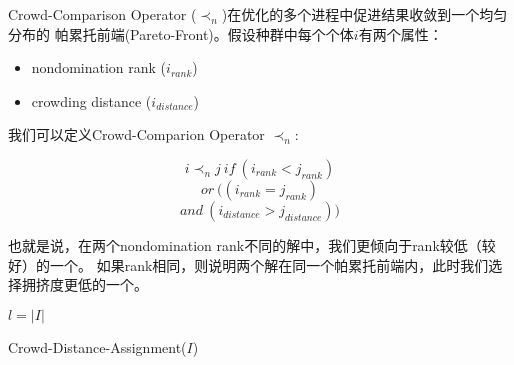 Crowd-Comparison Operator ($\prec_{n}$)在优化的多个进程中促进结果收敛到一个均匀分布的
帕累托前端(Pareto-Front)。假设种群中每个个体$i$有两个属性：
\begin{itemize}
    \item nondomination rank ($i_{rank}$)
    \item crowding distance ($i_{distance}$)
\end{itemize}
我们可以定义Crowd-Comparion Operator $\prec_{n}$:

$$ i \prec_{n} j \ if\  (i_{rank} < j_{rank})$$
$$ or\  ( (i_{rank} = j_{rank}) $$
$$ and\  (i_{distance} > j_{distance}) )$$

也就是说，在两个nondomination rank不同的解中，我们更倾向于rank较低（较好）的一个。
如果rank相同，则说明两个解在同一个帕累托前端内，此时我们选择拥挤度更低的一个。

\begin{algorithm}
    
    $l = |I|$ 
	
	\caption{Crowd-Distance-Assignment($I$)}	
	\label{algo:crowd-distance-assign}
\end{algorithm}


